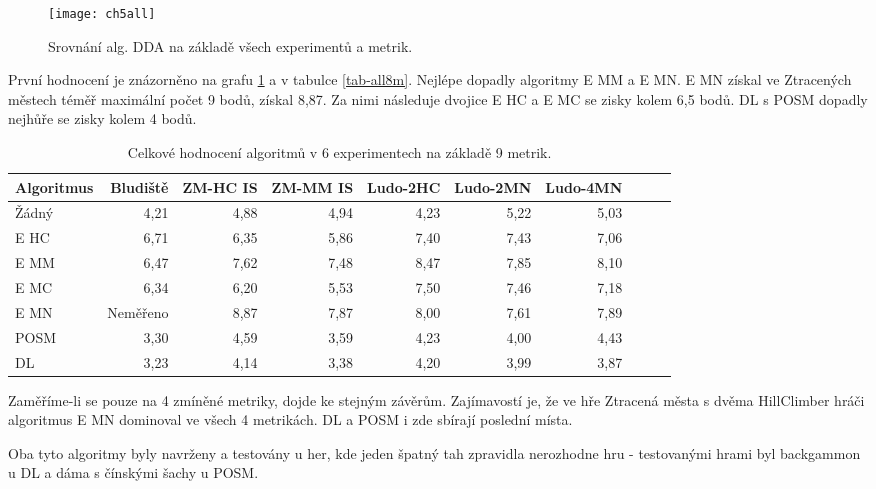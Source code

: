 \begin{figure}
  \centering
  \texttt{[image: ch5all]}
	\caption{ Srovnání alg. DDA na základě všech experimentů a metrik. }
	\label{fig-ch5all}
\end{figure}

První hodnocení je znázorněno na grafu \ref{fig-ch5all} a v tabulce \ref{tab-all8m}. Nejlépe dopadly algoritmy E MM a E MN. E MN získal ve Ztracených městech téměř maximální počet 9 bodů, získal 8,87. Za nimi následuje dvojice E HC a E MC se zisky kolem 6,5 bodů. DL s POSM dopadly nejhůře se zisky kolem 4 bodů.

\begin{table*}[b]\footnotesize
\vspace*{0mm}
\caption{{\label{tab-all8m}} Celkové hodnocení algoritmů v 6 experimentech na základě 9 metrik.}
\vspace*{0mm}
\label{shadowtable}
\begin{center}
\begin{tabular}{| l || r | r | r | r | r | r | r | r | r |}
\hline
Algoritmus & Bludiště & ZM-HC IS & ZM-MM IS & Ludo-2HC & Ludo-2MN & Ludo-4MN \\
\hline
\hline
Žádný & 4,21 & 4,88 & 4,94 & 4,23 & 5,22 & 5,03\\ \hline  
E HC & 6,71 & 6,35 & 5,86 & 7,40 & 7,43 & 7,06\\ \hline  
E MM & 6,47 & 7,62 & 7,48 & 8,47 & 7,85 & 8,10\\ \hline  
E MC & 6,34 & 6,20 & 5,53 & 7,50 & 7,46 & 7,18\\ \hline  
E MN & Neměřeno & 8,87 & 7,87 & 8,00 & 7,61 & 7,89\\ \hline  
POSM & 3,30 & 4,59 & 3,59 & 4,23 & 4,00 & 4,43\\ \hline  
DL & 3,23 & 4,14 & 3,38 & 4,20 & 3,99 & 3,87\\ \hline  
\end{tabular}
\end{center}
\end{table*}

Zaměříme-li se pouze na 4 zmíněné metriky, dojde ke stejným závěrům. Zajímavostí je, že ve hře Ztracená města s dvěma HillClimber hráči algoritmus E MN dominoval ve všech 4 metrikách. DL a POSM i zde sbírají poslední místa.

Oba tyto algoritmy byly navrženy a testovány u her, kde jeden špatný tah zpravidla nerozhodne hru - testovanými hrami byl backgammon u DL a dáma s čínskými šachy u POSM.

